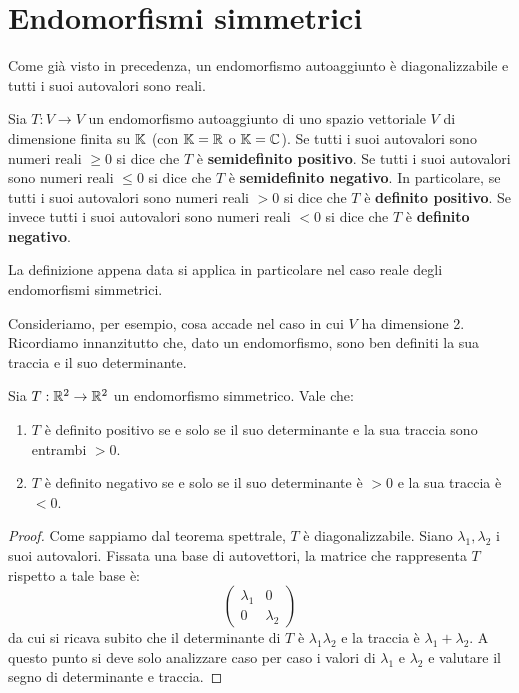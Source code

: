 \section{Endomorfismi simmetrici}
Come già visto in precedenza, un endomorfismo autoaggiunto è diagonalizzabile e
tutti i suoi autovalori sono reali.

\begin{definition}
	Sia $T : V \to V$ un endomorfismo autoaggiunto di uno spazio vettoriale $V$ di
	dimensione finita su $\mathbb{K}$ (con $\mathbb{K} = \mathbb{R}$ o
	$\mathbb{K} = \mathbb{C}$). Se tutti i suoi autovalori sono numeri reali $\geq 0$
	si dice che $T$ è \textbf{semidefinito positivo}. Se tutti i suoi autovalori
	sono numeri reali $\leq 0$ si dice che $T$ è \textbf{semidefinito negativo}.
	In particolare, se tutti i suoi autovalori sono numeri reali $> 0$ si dice che
	$T$ è \textbf{definito positivo}. Se invece tutti i suoi autovalori sono numeri
	reali $< 0$ si dice che $T$ è \textbf{definito negativo}.
\end{definition}

La definizione appena data si applica in particolare nel caso reale degli
endomorfismi simmetrici.

Consideriamo, per esempio, cosa accade nel caso in cui $V$ ha dimensione 2.
Ricordiamo innanzitutto che, dato un endomorfismo, sono ben definiti la sua traccia
e il suo determinante.

\begin{proposition}
	Sia $T : \mathbb{R}^2 \to \mathbb{R}^2$ un endomorfismo simmetrico. Vale che:
	\begin{enumerate}
		\item
		      $T$ è definito positivo se e solo se il suo determinante e la sua
		      traccia sono entrambi $> 0$.
		\item
		      $T$ è definito negativo se e solo se il suo determinante è $> 0$ e
		      la sua traccia è $< 0$.
	\end{enumerate}

	\begin{proof}
		Come sappiamo dal teorema spettrale, $T$ è diagonalizzabile. Siano
		$\lambda_1, \lambda_2$ i suoi autovalori. Fissata una base di autovettori,
		la matrice che rappresenta $T$ rispetto a tale base è:
		\[
			\begin{pmatrix}
				\lambda_1 & 0         \\
				0         & \lambda_2
			\end{pmatrix}
		\]
		da cui si ricava subito che il determinante di $T$ è $\lambda_1 \lambda_2$
		e la traccia è $\lambda_1 + \lambda_2$. A questo punto si deve solo
		analizzare caso per caso i valori di $\lambda_1$ e $\lambda_2$ e valutare
		il segno di determinante e traccia.
	\end{proof}
\end{proposition}

